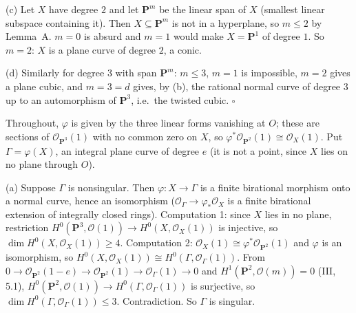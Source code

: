 \documentclass[11pt]{article}
\begin{document}
(c) Let $X$ have degree $2$ and let $\mathbf P^m$ be the linear span of $X$ (smallest linear subspace containing it). Then $X\subseteq\mathbf P^m$ is not in a hyperplane, so $m\le2$ by Lemma~A. $m=0$ is absurd and $m=1$ would make $X=\mathbf P^1$ of degree $1$. So $m=2$: $X$ is a plane curve of degree $2$, a conic.

(d) Similarly for degree $3$ with span $\mathbf P^m$: $m\le3$, $m=1$ is impossible, $m=2$ gives a plane cubic, and $m=3=d$ gives, by (b), the rational normal curve of degree $3$ up to an automorphism of $\mathbf P^3$, i.e.\ the twisted cubic. \hfill$\square$

\pf
Throughout, $\varphi$ is given by the three linear forms vanishing at $O$; these are sections of $\mathcal O_{\mathbf P^3}(1)$ with no common zero on $X$, so $\varphi^*\mathcal O_{\mathbf P^2}(1)\cong\mathcal O_X(1)$. Put $\Gamma=\varphi(X)$, an integral plane curve of degree $e$ (it is not a point, since $X$ lies on no plane through $O$).

(a) Suppose $\Gamma$ is nonsingular. Then $\varphi:X\to\Gamma$ is a finite birational morphism onto a normal curve, hence an isomorphism ($\mathcal O_\Gamma\to\varphi_*\mathcal O_X$ is a finite birational extension of integrally closed rings). Computation 1: since $X$ lies in no plane, restriction $H^0(\mathbf P^3,\mathcal O(1))\to H^0(X,\mathcal O_X(1))$ is injective, so $\dim H^0(X,\mathcal O_X(1))\ge4$. Computation 2: $\mathcal O_X(1)\cong\varphi^*\mathcal O_{\mathbf P^2}(1)$ and $\varphi$ is an isomorphism, so $H^0(X,\mathcal O_X(1))\cong H^0(\Gamma,\mathcal O_\Gamma(1))$. From $0\to\mathcal O_{\mathbf P^2}(1-e)\to\mathcal O_{\mathbf P^2}(1)\to\mathcal O_\Gamma(1)\to0$ and $H^1(\mathbf P^2,\mathcal O(m))=0$ (III, 5.1), $H^0(\mathbf P^2,\mathcal O(1))\to H^0(\Gamma,\mathcal O_\Gamma(1))$ is surjective, so $\dim H^0(\Gamma,\mathcal O_\Gamma(1))\le3$. Contradiction. So $\Gamma$ is singular.
\end{document}
